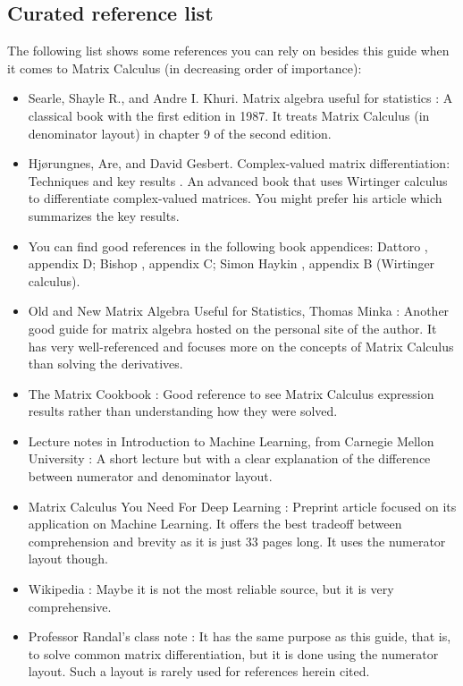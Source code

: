 \documentclass{article}
\begin{document}
\subsection{Curated reference list}
The following list shows some references you can rely on besides this guide when it comes to Matrix Calculus (in decreasing order of importance):
\begin{itemize}
    \item Searle, Shayle R., and Andre I. Khuri. Matrix algebra useful for statistics \cite{searle2017matrix}: A classical book with the first edition in 1987. It treats Matrix Calculus (in denominator layout) in chapter 9 of the second edition.
    \item Hj\o rungnes, Are, and David Gesbert. Complex-valued matrix differentiation: Techniques and key results \cite{hjorungnes2011complex}. An advanced book that uses Wirtinger calculus to differentiate complex-valued matrices. You might prefer his article \cite{hjorungnes2007complex} which summarizes the key results.
    \item You can find good references in the following book appendices: Dattoro \cite{dattorroConvexOptimizationEuclidean2010}, appendix D; Bishop \cite{bishopPatternRecognitionMachine2006}, appendix C; Simon Haykin \cite{haykin2009neural}, appendix B (Wirtinger calculus).
    \item Old and New Matrix Algebra Useful for Statistics, Thomas Minka \cite{ThomasMinka}: Another good guide for matrix algebra hosted on the personal site of the author. It has very well-referenced and focuses more on the concepts of Matrix Calculus than solving the derivatives.
    \item The Matrix Cookbook \cite{petersen2008matrix}: Good reference to see Matrix Calculus expression results rather than understanding how they were solved.
    \item Lecture notes in Introduction to Machine Learning, from Carnegie Mellon University \cite{Singh}: A short lecture but with a clear explanation of the difference between numerator and denominator layout.
    \item Matrix Calculus You Need For Deep Learning \cite{parrMatrixCalculusYou2018}: Preprint article focused on its application on Machine Learning. It offers the best tradeoff between comprehension and brevity as it is just 33 pages long. It uses the numerator layout though.
    \item Wikipedia \cite{Matrixca44:online}: Maybe it is not the most reliable source, but it is very comprehensive.
    \item Professor Randal's class note \cite{barnes2006matrix}: It has the same purpose as this guide, that is, to solve common matrix differentiation, but it is done using the numerator layout. Such a layout is rarely used for references herein cited.
\end{itemize}
\end{document}
